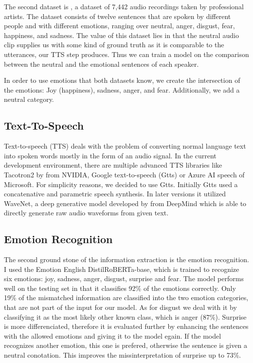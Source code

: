 \documentclass[11pt]{article}
\begin{document}
The second dataset is \cite{cao_data}, a dataset of 7,442 audio recordings taken by professional artists. The dataset consists of twelve sentences that are spoken by different people and with different emotions, ranging over neutral, anger, disgust, fear, happiness, and sadness. The value of this dataset lies in that the neutral audio clip supplies us with some kind of ground truth as it is comparable to the utterances, our TTS step produces. Thus we can train a model on the comparison between the neutral and the emotional sentences of each speaker.

In order to use emotions that both datasets know, we create the intersection of the emotions: Joy (happiness), sadness, anger, and fear. Additionally, we add a neutral category.
\subsection{Text-To-Speech}
Text-to-speech (TTS) deals with the problem of converting normal language text into spoken words mostly in the form of an audio signal. 
In the current development environment, there are multiple advanced TTS libraries like Tacotron2 by \cite{shen_natural_2018} from NVIDIA, Google text-to-speech (Gtts) \cite{gtts} or Azure AI speech of Microsoft. For simplicity reasons, we decided to use Gtts. Initially Gtts used a concatenative and parametric speech synthesis. In later versions it utilized WaveNet, a deep generative model developed by \citeauthor{van2016wavenet} from DeepMind which is able to directly generate raw audio waveforms from given text.
\subsection{Emotion Recognition}

The second ground stone of the information extraction is the emotion recognition. I used the Emotion English DistilRoBERTa-base\cite{hartmann2022emotionenglish}, which is trained to recognize six emotions: joy, sadness, anger, disgust, surprise and fear. The model performs well on the testing set in that it classifies 92\% of the emotions correctly. Only 19\% of the mismatched information are classified into the two emotion categories, that are not part of the input for our model. As for disgust we deal with it by classifying it as the most likely other known class, which is anger (87\%). Surprise is more differenciated, therefore it is evaluated further by enhancing the sentences with the allowed emotions and giving it to the model egain. If the model recognizes another emotion, this one is prefered, otherwise the sentence is given a neutral conotation. This improves the missinterpretation of surprise up to 73\%.
\end{document}
